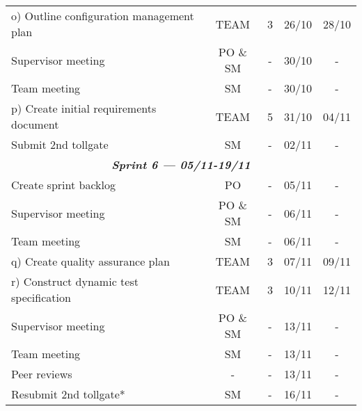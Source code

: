 \begin{longtable}[c]{@{}lcccc@{}}
o) Outline configuration management plan                 & TEAM                 & 3                 & 26/10          & 28/10        \\
Supervisor meeting                                       & PO \& SM             & -                 & 30/10          & -            \\
Team meeting                                             & SM                   & -                 & 30/10          & -            \\
p) Create initial requirements document                  & TEAM                 & 5                 & 31/10          & 04/11        \\
Submit 2nd tollgate                                      & SM                   & -                 & 02/11          & -            \\* \midrule
\multicolumn{5}{c}{\textit{\textbf{Sprint 6 --- 05/11-19/11}}}                                                                         \\
Create sprint backlog                                    & PO                   & -                 & 05/11          & -            \\
Supervisor meeting                                       & PO \& SM             & -                 & 06/11          & -            \\
Team meeting                                             & SM                   & -                 & 06/11          & -            \\
q) Create quality assurance plan                         & TEAM                 & 3                 & 07/11          & 09/11        \\
r) Construct dynamic test specification                  & TEAM                 & 3                 & 10/11          & 12/11        \\
Supervisor meeting                                       & PO \& SM             & -                 & 13/11          & -            \\
Team meeting                                             & SM                   & -                 & 13/11          & -            \\
Peer reviews                                             & -                    & -                 & 13/11          & -            \\
Resubmit 2nd tollgate*                                   & SM                   & -                 & 16/11          & -            \\* \midrule

\end{longtable}
